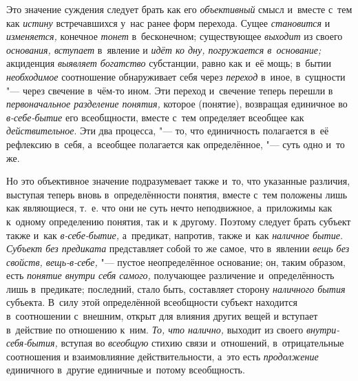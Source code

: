 \label{bkm:bm31a}Это значение суждения следует брать как его {\em объективный}
смысл и~вместе с~тем как {\em истину} встречавшихся у~нас ранее форм перехода.
Сущее {\em становится} и {\em изменяется,} конечное {\em тонет} в~бесконечном;
существующее {\em выходит} из своего {\em основания, вступает} в~явление
и {\em идёт ко дну, погружается в~основание;} акциденция {\em выявляет
богатство} субстанции, равно как и~её мощь; в~бытии {\em необходимое}
соотношение обнаруживает себя через {\em переход} в~иное, в~сущности "--- через
свечение в~чём-то ином. Эти переход и~свечение теперь перешли
в {\em первоначальное разделение понятия,} которое (понятие), возвращая
единичное во {\em в-себе-бытие} его всеобщности, вместе с~тем определяет
всеобщее как {\em действительное}. Эти два процесса, "--- то, что единичность
полагается в~её рефлексию в~себя, а~всеобщее полагается как
определённое, "--- суть одно и~то же.

Но это объективное значение подразумевает также и~то, что
указанные различия, выступая теперь вновь в~определённости понятия, вместе
с~тем положены лишь как являющиеся, т.~е. что они не суть нечто
неподвижное, а~приложимы как к~одному определению понятия, так и~к другому.
Поэтому следует брать субъект также и~как {\em в-себе-бытие,}
а~предикат, напротив, также и~как {\em наличное бытие}.
{\em Субъект без предиката} представляет собой то же самое, что в~явлении
{\em вещь без свойств, вещь-в-себе,} "--- пустое неопределённое
основание; он, таким образом, есть {\em понятие внутри себя самого,}
получающее различение и~определённость лишь в~предикате;
последний, стало быть, составляет сторону {\em наличного бытия}
субъекта. В~силу этой определённой всеобщности субъект
находится в~соотношении с~внешним, открыт для влияния других вещей и
вступает в~действие по отношению к~ним. {\em То, что налично,} выходит
из своего {\em внутри-себя-бытия,} вступая во {\em всеобщую}
стихию связи и~отношений, в~отрицательные соотношения и
взаимовлияние действительности, а~это есть {\em продолжение}
единичного в~другие единичные и~потому всеобщность.

